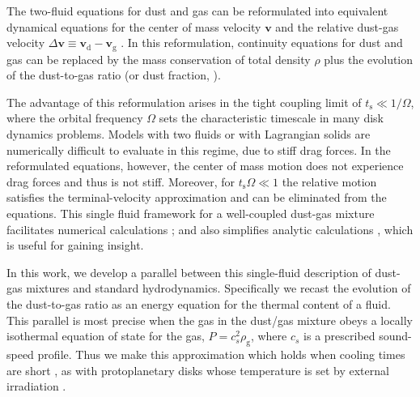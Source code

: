 \documentclass[iop, numberedappendix]{emulateapj}
\newcommand{\rhod}{\rho_\mathrm{d}}
\newcommand{\rhog}{\rho_\mathrm{g}}
\newcommand{\tstop}{t_\mathrm{s}}
\begin{document}
The two-fluid equations for dust and gas can be reformulated into 
equivalent dynamical equations for the center of mass velocity $\bm{v}$
and the relative dust-gas velocity  $\Delta\bm{v}\equiv \bm{v}_\mathrm{d}-\bm{v}_\mathrm{g}$ 
\citep{youdin05a}. In this reformulation, continuity equations for dust and gas can be replaced 
by the mass conservation of total density $\rho$ plus the evolution of the dust-to-gas ratio 
(or dust fraction, \citealp{laibe14}).

The advantage of this reformulation arises in the tight coupling limit of  $\tstop \ll 1/\Omega$, where the orbital frequency $\Omega$ sets the characteristic timescale in many disk dynamics problems.
Models with two fluids or with Lagrangian solids are numerically difficult to evaluate in this regime, due to stiff drag forces.  
In the reformulated equations, however, the center of mass motion does
not experience drag forces and thus is not stiff.  Moreover,
for $\tstop\Omega\ll 1$ the relative motion satisfies the terminal-velocity approximation and can be eliminated from the equations.  This single fluid framework for a well-coupled dust-gas mixture facilitates numerical calculations \citep{price15}; and also simplifies analytic calculations \citep{youdin05a,jacquet11}, which is useful for gaining insight.  

%



In this work, we develop a parallel between this single-fluid description of dust-gas mixtures and standard hydrodynamics.
Specifically we recast the evolution of the dust-to-gas ratio as an energy equation for the thermal content of a fluid.
This parallel is most precise when the gas in the dust/gas mixture obeys a locally isothermal equation of state for the gas, $P = c_s^2\rhog$, where $c_s$ is a prescribed sound-speed profile.  Thus we make this approximation which holds when cooling times are short \citep{lin15}, as with protoplanetary disks 
 whose temperature is set by external irradiation
\citep{chiang97,stam08}. 
\end{document}
